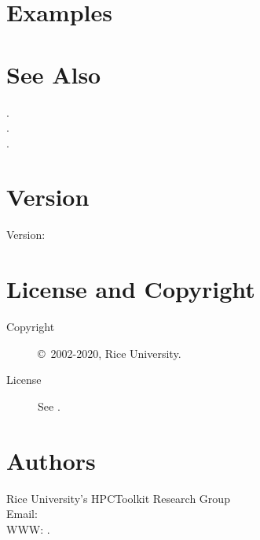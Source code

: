 \documentclass[english]{article}
\begin{document}
\section{Examples}






\section{See Also}

.\\
.\\
.

\section{Version}

Version: \Version

\section{License and Copyright}

\begin{description}
\item[Copyright] \copyright\ 2002-2020, Rice University.
\item[License] See .
\end{description}

\section{Authors}

\noindent
Rice University's HPCToolkit Research Group \\
Email:  \\
WWW: .

\LatexManEnd
\end{document}
